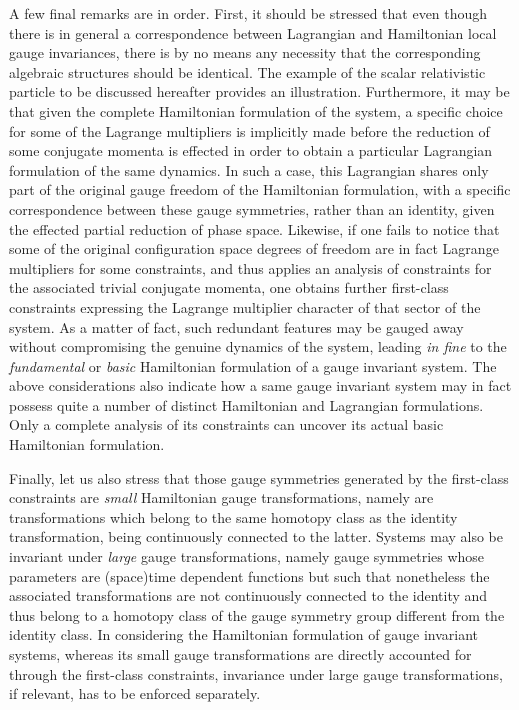 \documentclass[a4paper,11pt]{article}
\begin{document}
A few final remarks are in order.\cite{JG1} First, it should be stressed that
even though there is in general a correspondence between Lagrangian and
Hamiltonian local gauge invariances, there is by no means any necessity that
the corresponding algebraic structures should be identical. The example of
the scalar relativistic particle to be discussed hereafter provides an
illustration. Furthermore, it may be that given the complete Hamiltonian
formulation of the system, a specific choice for some of the Lagrange
multipliers is implicitly made before the reduction of some conjugate 
momenta is effected in order to obtain a particular Lagrangian formulation 
of the same dynamics. In such a case, this Lagrangian shares only part of the
original gauge freedom of the Hamiltonian formulation, with a specific
correspondence between these gauge symmetries, rather than an identity, 
given the effected partial reduction of phase space. Likewise, if one fails
to notice that some of the original configuration space degrees of freedom
are in fact Lagrange multipliers for some constraints, and thus applies
an analysis of constraints for the associated tri\-vial conjugate momenta,
one obtains further first-class constraints expressing the Lagrange multiplier 
character of that sector of the system. As a matter of fact, such
redundant features may be gauged away without compromising the
genuine dynamics of the system, leading {\sl in fine\/} to the 
{\sl fundamental\/} or {\sl basic\/} Hamiltonian formulation\cite{JG1} of a 
gauge invariant system. The above con\-si\-de\-ra\-tions also indicate
how a same gauge invariant system may in fact possess quite a number
of distinct Hamiltonian and Lagrangian formulations. Only a complete
analysis of its constraints can uncover its actual basic Hamiltonian
formulation.

Finally, let us also stress that those gauge symmetries generated by
the first-class constraints are {\sl small\/} Hamiltonian gauge transformations,
namely are transformations which belong to the same homotopy class as
the identity transformation, being continuously connected to the latter.
Systems may also be invariant under {\sl large\/} gauge transformations,
namely gauge symmetries whose parameters are (space)time dependent functions
but such that nonetheless the associated transformations are not
continuously connected to the identity and thus belong to a homotopy
class of the gauge symmetry group different from the identity class.
In considering the Hamiltonian formulation of gauge invariant systems,
whereas its small gauge transformations are directly accounted for through
the first-class constraints, invariance under large gauge transformations, 
if relevant, has to be enforced separately.
\end{document}
